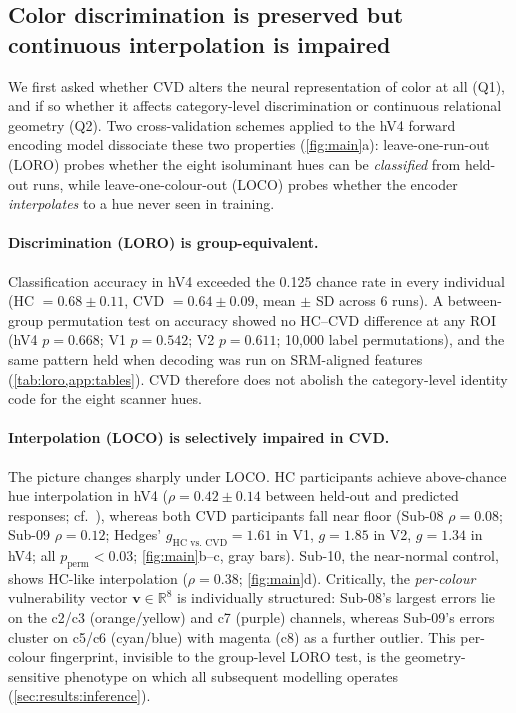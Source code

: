 \subsection{Color discrimination is preserved but continuous
interpolation is impaired}
\label{sec:results:dissociation}

We first asked whether CVD alters the neural representation of color at
all (Q1), and if so whether it affects category-level discrimination or
continuous relational geometry (Q2). Two cross-validation schemes
applied to the hV4 forward encoding model dissociate these two
properties (\cref{fig:main}a): leave-one-run-out (LORO) probes whether
the eight isoluminant hues can be \emph{classified} from held-out runs,
while leave-one-colour-out (LOCO) probes whether the encoder
\emph{interpolates} to a hue never seen in training.

\paragraph{Discrimination (LORO) is group-equivalent.}
Classification accuracy in hV4 exceeded the 0.125 chance rate in every
individual (HC $= 0.68 \pm 0.11$, CVD $= 0.64 \pm 0.09$, mean $\pm$ SD
across 6 runs). A between-group permutation test on accuracy showed no
HC--CVD difference at any ROI (hV4 $p = 0.668$; V1 $p = 0.542$; V2
$p = 0.611$; 10{,}000 label permutations), and the same pattern held
when decoding was run on SRM-aligned features
(\cref{tab:loro,app:tables}). CVD therefore does not abolish the
category-level identity code for the eight scanner hues.

\paragraph{Interpolation (LOCO) is selectively impaired in CVD.}
The picture changes sharply under LOCO. HC participants achieve above-chance
hue interpolation in hV4 ($\rho = 0.42 \pm 0.14$ between held-out and
predicted responses; cf.~\citealp{brouwer2009}), whereas both CVD
participants fall near floor (Sub-08 $\rho = 0.08$; Sub-09 $\rho = 0.12$;
Hedges' $g_{\text{HC vs.\ CVD}} = 1.61$ in V1, $g = 1.85$ in V2, $g = 1.34$
in hV4; all $p_{\text{perm}} < 0.03$; \cref{fig:main}b--c, gray bars).
Sub-10, the near-normal control, shows HC-like interpolation
($\rho = 0.38$; \cref{fig:main}d). Critically, the \emph{per-colour}
vulnerability vector $\mathbf{v} \in \mathbb{R}^{8}$ is individually
structured: Sub-08's largest errors lie on the c2/c3 (orange/yellow)
and c7 (purple) channels, whereas Sub-09's errors cluster on c5/c6
(cyan/blue) with magenta (c8) as a further outlier. This per-colour
fingerprint, invisible to the group-level LORO test, is the geometry-sensitive
phenotype on which all subsequent modelling operates
(\cref{sec:results:inference}).

